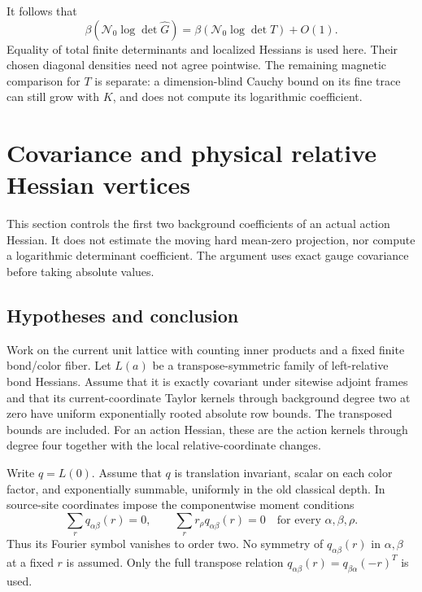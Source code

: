 \documentclass[11pt]{article}
\theoremstyle{remark}
\begin{document}
It follows that
\begin{equation}
 \beta(\mathcal N_0\log\det\widehat G)
       =\beta(\mathcal N_0\log\det T)+O(1).
 \label{ssc-scalar-reduction}
\end{equation}
Equality of total finite determinants and localized Hessians is
used here. Their chosen diagonal densities need not agree pointwise.
The remaining magnetic comparison for \(T\) is separate: a
dimension-blind Cauchy bound on its fine trace can still grow with
\(K\), and does not compute its logarithmic coefficient.


\section{Covariance and physical relative Hessian vertices}
\label{chr-section}

This section controls the first two background coefficients of an
actual action Hessian.  It does not estimate the moving hard
mean-zero projection, nor compute a logarithmic determinant
coefficient.  The argument uses exact gauge covariance before
taking absolute values.

\subsection{Hypotheses and conclusion}
\label{chr-hypotheses}

Work on the current unit lattice with counting inner products and a
fixed finite bond/color fiber.  Let \(L(a)\) be a transpose-symmetric
family of left-relative bond Hessians.  Assume that it is exactly
covariant under sitewise adjoint frames and that its current-coordinate
Taylor kernels through background degree two at zero have uniform
exponentially rooted absolute row bounds.  The transposed bounds are
included.  For an action Hessian, these are the action kernels through
degree four together with the local relative-coordinate changes.

Write \(q=L(0)\).  Assume that \(q\) is translation invariant, scalar
on each color factor, and exponentially summable, uniformly in the
old classical depth.  In source-site coordinates impose the
componentwise moment conditions
\begin{equation}
 \sum_r q_{\alpha\beta}(r)=0,\qquad
 \sum_r r_\rho q_{\alpha\beta}(r)=0
 \quad\text{for every }\alpha,\beta,\rho .
 \label{chr-moments}
\end{equation}
Thus its Fourier symbol vanishes to order two.  No symmetry of
\(q_{\alpha\beta}(r)\) in \(\alpha,\beta\) at a fixed \(r\) is assumed.
Only the full transpose relation
\(q_{\alpha\beta}(r)=q_{\beta\alpha}(-r)^T\) is used.
\end{document}
